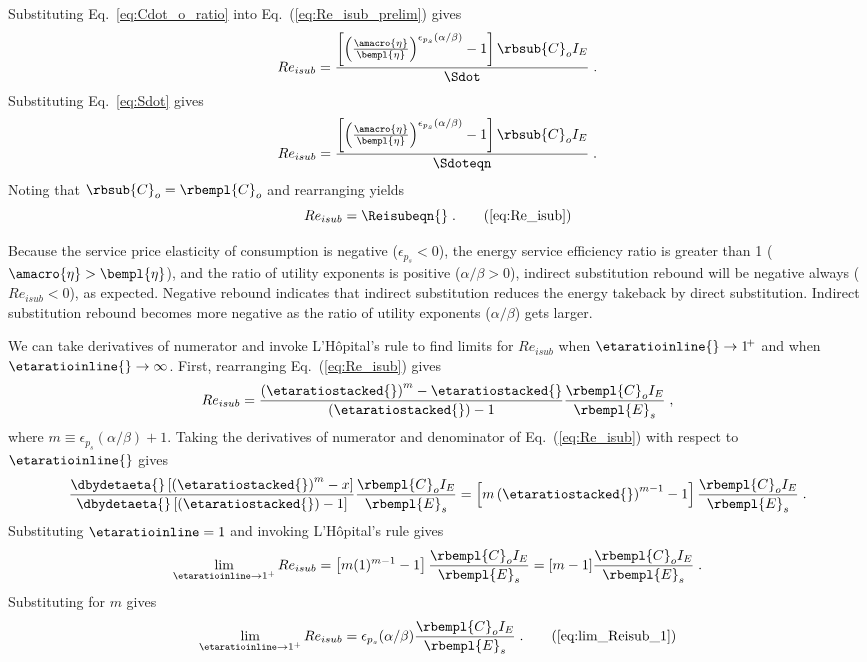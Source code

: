 Substituting Eq.~\ref{eq:Cdot_o_ratio} into Eq.~(\ref{eq:Re_isub_prelim}) gives
%
\begin{equation}
  Re_{isub} = \frac{\left[ \left( \frac{\amacro{\eta}}{\bempl{\eta}} \right)^{\epsilon_{p_s} (\alpha / \beta)} - 1  \right] \rbsub{C}_o I_E} {\Sdot} \; .
\end{equation}
Substituting Eq.~\ref{eq:Sdot} gives
%
\begin{equation}
  Re_{isub} = \frac{\left[ \left(\frac{\amacro{\eta}}{\bempl{\eta}} \right)
                  ^{\epsilon_{p_s} (\alpha / \beta )} - 1  \right] \rbsub{C}_o I_E}
                  {\Sdoteqn} \; .
\end{equation}
%
Noting that $\rbsub{C}_o = \rbempl{C}_o$ and rearranging yields
%
\begin{equation}
  Re_{isub} = \Reisubeqn{} \; . \tag{\ref{eq:Re_isub}}
\end{equation}

Because the service price elasticity of consumption is negative ($\epsilon_{p_s} < 0$),
the energy service efficiency ratio is greater than 1 ($\amacro{\eta} > \bempl{\eta}$),
and
the ratio of utility exponents is positive ($\alpha / \beta > 0$),
indirect substitution rebound will be negative always ($Re_{isub} < 0$),
as expected.
Negative rebound indicates that indirect substitution reduces the energy takeback by direct substitution.
Indirect substitution rebound becomes more negative
as the ratio of utility exponents ($\alpha / \beta$) gets larger.

We can take derivatives of numerator and invoke L'H\^{o}pital's rule
to find limits for $Re_{isub}$ when
$\etaratioinline{} \to 1^{\! +}$ and when
$\etaratioinline{} \to \infty$.
First, rearranging Eq.~(\ref{eq:Re_isub}) gives
%
\begin{equation}
  Re_{isub} = \frac{\left( \etaratiostacked{} \right)^m - \etaratiostacked{}}{\left( \etaratiostacked{} \right) - 1} \frac{\rbempl{C}_o I_E}{\rbempl{E}_s} \; ,
\end{equation}
%
where $m \equiv \epsilon_{p_s} (\alpha/\beta) + 1$.
Taking the derivatives of numerator and denominator of Eq.~(\ref{eq:Re_isub})
with respect to $\etaratioinline{}$ gives
%
\begin{equation}
  \frac{\dbydetaeta{} \left[ \left( \etaratiostacked{} \right)^m - x \right]}
            {\dbydetaeta{}\left[ \left( \etaratiostacked{} \right)  - 1 \right] } \frac{\rbempl{C}_o I_E}{\rbempl{E}_s} 
       = \left[ m \left( \etaratiostacked{} \right)^{m-1} - 1 \right] \frac{\rbempl{C}_o I_E}{\rbempl{E}_s} \; .
\end{equation}
%
Substituting $\etaratioinline = 1$ and invoking L'H\^{o}pital's rule gives
%
\begin{equation}
  \lim_{\etaratioinline \to 1^{+}} Re_{isub} 
        = \left[ m ( 1 )^{m-1} - 1 \right] \frac{\rbempl{C}_o I_E}{\rbempl{E}_s}
        = [m - 1] \frac{\rbempl{C}_o I_E}{\rbempl{E}_s} \; .
\end{equation}
%
Substituting for $m$ gives
%
\begin{equation}
  \lim_{\etaratioinline \to 1^{+}} Re_{isub} 
        = \epsilon_{p_s} (\alpha/\beta) \frac{\rbempl{C}_o I_E}{\rbempl{E}_s} \; . \tag{\ref{eq:lim_Reisub_1}}
\end{equation}

